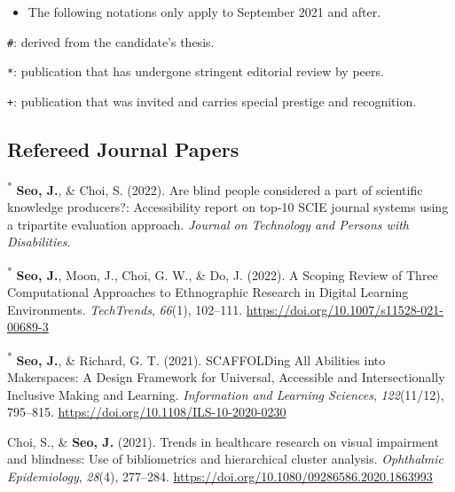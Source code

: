 \documentclass[11pt,a4paper,]{awesome-cv}
\providecommand{\tightlist}{%
	\setlength{\itemsep}{0pt}\setlength{\parskip}{0pt}}
\begin{document}
\begin{itemize}
  \tightlist
  \item
        The following notations only apply to September 2021 and after.
\end{itemize}

\texttt{\#}: derived from the candidate's thesis.

\texttt{*}: publication that has undergone stringent editorial review by
peers.

\texttt{+}: publication that was invited and carries special prestige
and recognition.

\hypertarget{refereed-journal-papers}{%
  \subsection{Refereed Journal Papers}\label{refereed-journal-papers}}

\hypertarget{refs_journals}{}
\leavevmode{}%
\textsuperscript{*} \textbf{Seo, J.}, \& Choi, S. (2022). Are blind
people considered a part of scientific knowledge producers?:
Accessibility report on top-10 SCIE journal systems using a tripartite
evaluation approach. \emph{Journal on Technology and Persons with
  Disabilities}.

\leavevmode{}%
\textsuperscript{*} \textbf{Seo, J.}, Moon, J., Choi, G. W., \& Do, J.
(2022). A {Scoping Review} of {Three Computational Approaches} to
  {Ethnographic Research} in {Digital Learning Environments}.
\emph{TechTrends}, \emph{66}(1), 102--111.
\url{https://doi.org/10.1007/s11528-021-00689-3}

\leavevmode{}%
\textsuperscript{*} \textbf{Seo, J.}, \& Richard, G. T. (2021).
  {SCAFFOLDing All Abilities} into {Makerspaces}: {A Design Framework} for
  {Universal}, {Accessible} and {Intersectionally Inclusive Making} and
  {Learning}. \emph{Information and Learning Sciences}, \emph{122}(11/12),
795--815. \url{https://doi.org/10.1108/ILS-10-2020-0230}

\leavevmode{}%
Choi, S., \& \textbf{Seo, J.} (2021). Trends in healthcare research on
visual impairment and blindness: Use of bibliometrics and hierarchical
cluster analysis. \emph{Ophthalmic Epidemiology}, \emph{28}(4),
277--284. \url{https://doi.org/10.1080/09286586.2020.1863993}
\end{document}
